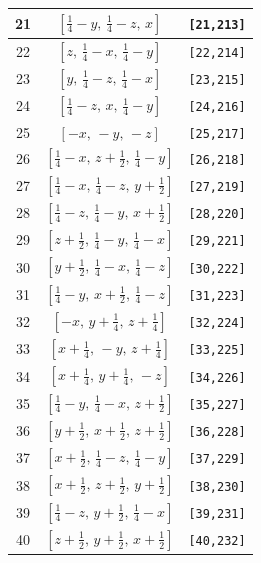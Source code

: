 \documentclass[fleqn,8pt]{jsarticle}
\begin{document}
\begin{longtable}{ccc}
21 & $\left[ \frac{1}{4} - y,\, \frac{1}{4} - z,\, x \right]$ & {\tt [21,213]} \\ \hline
22 & $\left[ z,\, \frac{1}{4} - x,\, \frac{1}{4} - y \right]$ & {\tt [22,214]} \\ \hline
23 & $\left[ y,\, \frac{1}{4} - z,\, \frac{1}{4} - x \right]$ & {\tt [23,215]} \\ \hline
24 & $\left[ \frac{1}{4} - z,\, x,\, \frac{1}{4} - y \right]$ & {\tt [24,216]} \\ \hline
25 & $\left[ - x,\, - y,\, - z \right]$ & {\tt [25,217]} \\ \hline
26 & $\left[ \frac{1}{4} - x,\, z + \frac{1}{2},\, \frac{1}{4} - y \right]$ & {\tt [26,218]} \\ \hline
27 & $\left[ \frac{1}{4} - x,\, \frac{1}{4} - z,\, y + \frac{1}{2} \right]$ & {\tt [27,219]} \\ \hline
28 & $\left[ \frac{1}{4} - z,\, \frac{1}{4} - y,\, x + \frac{1}{2} \right]$ & {\tt [28,220]} \\ \hline
29 & $\left[ z + \frac{1}{2},\, \frac{1}{4} - y,\, \frac{1}{4} - x \right]$ & {\tt [29,221]} \\ \hline
30 & $\left[ y + \frac{1}{2},\, \frac{1}{4} - x,\, \frac{1}{4} - z \right]$ & {\tt [30,222]} \\ \hline
31 & $\left[ \frac{1}{4} - y,\, x + \frac{1}{2},\, \frac{1}{4} - z \right]$ & {\tt [31,223]} \\ \hline
32 & $\left[ - x,\, y + \frac{1}{4},\, z + \frac{1}{4} \right]$ & {\tt [32,224]} \\ \hline
33 & $\left[ x + \frac{1}{4},\, - y,\, z + \frac{1}{4} \right]$ & {\tt [33,225]} \\ \hline
34 & $\left[ x + \frac{1}{4},\, y + \frac{1}{4},\, - z \right]$ & {\tt [34,226]} \\ \hline
35 & $\left[ \frac{1}{4} - y,\, \frac{1}{4} - x,\, z + \frac{1}{2} \right]$ & {\tt [35,227]} \\ \hline
36 & $\left[ y + \frac{1}{2},\, x + \frac{1}{2},\, z + \frac{1}{2} \right]$ & {\tt [36,228]} \\ \hline
37 & $\left[ x + \frac{1}{2},\, \frac{1}{4} - z,\, \frac{1}{4} - y \right]$ & {\tt [37,229]} \\ \hline
38 & $\left[ x + \frac{1}{2},\, z + \frac{1}{2},\, y + \frac{1}{2} \right]$ & {\tt [38,230]} \\ \hline
39 & $\left[ \frac{1}{4} - z,\, y + \frac{1}{2},\, \frac{1}{4} - x \right]$ & {\tt [39,231]} \\ \hline
40 & $\left[ z + \frac{1}{2},\, y + \frac{1}{2},\, x + \frac{1}{2} \right]$ & {\tt [40,232]} \\ \hline

\end{longtable}
\end{document}
